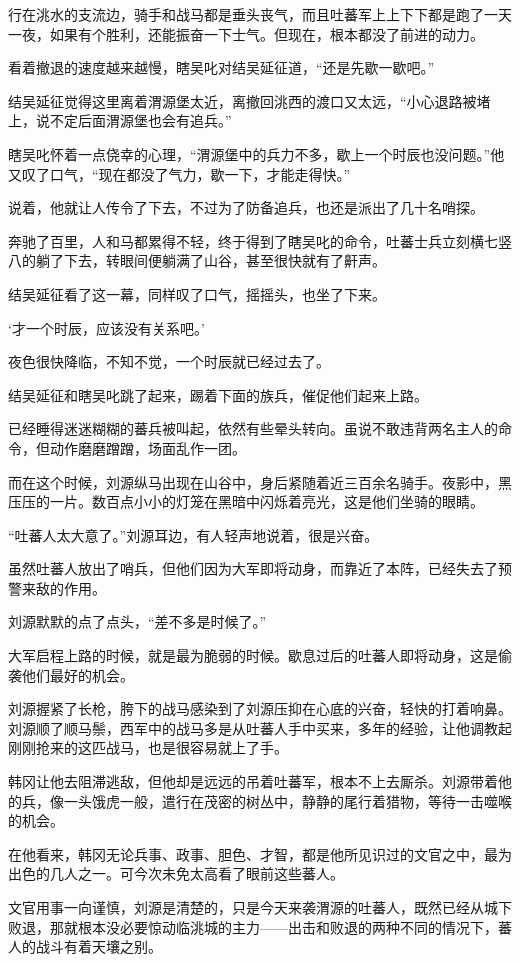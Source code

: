 行在洮水的支流边，骑手和战马都是垂头丧气，而且吐蕃军上上下下都是跑了一天一夜，如果有个胜利，还能振奋一下士气。但现在，根本都没了前进的动力。

看着撤退的速度越来越慢，瞎吴叱对结吴延征道，“还是先歇一歇吧。”

结吴延征觉得这里离着渭源堡太近，离撤回洮西的渡口又太远，“小心退路被堵上，说不定后面渭源堡也会有追兵。”

瞎吴叱怀着一点侥幸的心理，“渭源堡中的兵力不多，歇上一个时辰也没问题。”他又叹了口气，“现在都没了气力，歇一下，才能走得快。”

说着，他就让人传令了下去，不过为了防备追兵，也还是派出了几十名哨探。

奔驰了百里，人和马都累得不轻，终于得到了瞎吴叱的命令，吐蕃士兵立刻横七竖八的躺了下去，转眼间便躺满了山谷，甚至很快就有了鼾声。

结吴延征看了这一幕，同样叹了口气，摇摇头，也坐了下来。

‘才一个时辰，应该没有关系吧。’

夜色很快降临，不知不觉，一个时辰就已经过去了。

结吴延征和瞎吴叱跳了起来，踢着下面的族兵，催促他们起来上路。

已经睡得迷迷糊糊的蕃兵被叫起，依然有些晕头转向。虽说不敢违背两名主人的命令，但动作磨磨蹭蹭，场面乱作一团。

而在这个时候，刘源纵马出现在山谷中，身后紧随着近三百余名骑手。夜影中，黑压压的一片。数百点小小的灯笼在黑暗中闪烁着亮光，这是他们坐骑的眼睛。

“吐蕃人太大意了。”刘源耳边，有人轻声地说着，很是兴奋。

虽然吐蕃人放出了哨兵，但他们因为大军即将动身，而靠近了本阵，已经失去了预警来敌的作用。

刘源默默的点了点头，“差不多是时候了。”

大军启程上路的时候，就是最为脆弱的时候。歇息过后的吐蕃人即将动身，这是偷袭他们最好的机会。

刘源握紧了长枪，胯下的战马感染到了刘源压抑在心底的兴奋，轻快的打着响鼻。刘源顺了顺马鬃，西军中的战马多是从吐蕃人手中买来，多年的经验，让他调教起刚刚抢来的这匹战马，也是很容易就上了手。

韩冈让他去阻滞逃敌，但他却是远远的吊着吐蕃军，根本不上去厮杀。刘源带着他的兵，像一头饿虎一般，遣行在茂密的树丛中，静静的尾行着猎物，等待一击噬喉的机会。

在他看来，韩冈无论兵事、政事、胆色、才智，都是他所见识过的文官之中，最为出色的几人之一。可今次未免太高看了眼前这些蕃人。

文官用事一向谨慎，刘源是清楚的，只是今天来袭渭源的吐蕃人，既然已经从城下败退，那就根本没必要惊动临洮城的主力——出击和败退的两种不同的情况下，蕃人的战斗有着天壤之别。

